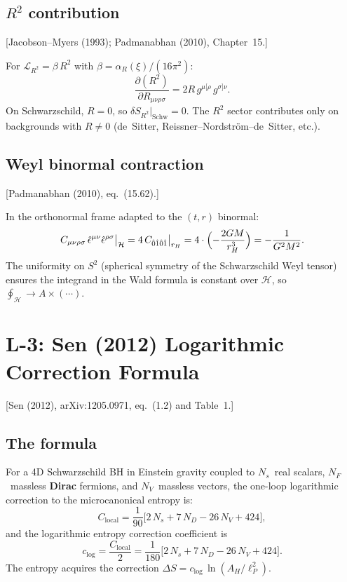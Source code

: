 \documentclass[12pt,a4paper]{article}
\theoremstyle{definition}
\theoremstyle{remark}
\newcommand{\fromlit}[1]{\textcolor{blue!70!black}{\textsf{[#1]}}}
\begin{document}
\subsection{$R^2$ contribution}
\fromlit{Jacobson--Myers (1993); Padmanabhan (2010), Chapter~15.}

For $\mathcal{L}_{R^2} = \beta\,R^2$ with
$\beta = \alpha_R(\xi)/(16\pi^2)$:
\begin{equation}
  \frac{\partial(R^2)}{\partial R_{\mu\nu\rho\sigma}}
  = 2R\,g^{\mu[\rho}\,g^{\sigma]\nu}.
\end{equation}
On Schwarzschild, $R = 0$, so $\delta S_{R^2}|_{\mathrm{Schw}} = 0$.
The $R^2$ sector contributes only on backgrounds with $R \neq 0$
(de~Sitter, Reissner--Nordstr\"om--de~Sitter, etc.).

\subsection{Weyl binormal contraction}
\fromlit{Padmanabhan (2010), eq.~(15.62).}

In the orthonormal frame adapted to the $(t,r)$ binormal:
\begin{equation}\label{eq:C-binormal}
  C_{\mu\nu\rho\sigma}\,\hat{\epsilon}^{\mu\nu}
  \hat{\epsilon}^{\rho\sigma}\big|_{\mathcal{H}}
  = 4\,C_{\hat{0}\hat{1}\hat{0}\hat{1}}\big|_{r_H}
  = 4 \cdot \Bigl(-\frac{2GM}{r_H^3}\Bigr)
  = -\frac{1}{G^2 M^2}.
\end{equation}
The uniformity on $S^2$ (spherical symmetry of the Schwarzschild
Weyl tensor) ensures the integrand in the Wald formula is constant
over $\mathcal{H}$, so $\oint_{\mathcal{H}} \to A \times (\cdots)$.


\section{L-3: Sen (2012) Logarithmic Correction Formula}
\label{sec:L3}

\fromlit{Sen (2012), arXiv:1205.0971, eq.~(1.2) and Table~1.}

\subsection{The formula}

For a 4D Schwarzschild BH in Einstein gravity coupled to $N_s$~real
scalars, $N_F$~massless \textbf{Dirac} fermions, and $N_V$~massless
vectors, the one-loop logarithmic correction to the microcanonical
entropy is:
\begin{equation}\label{eq:sen-formula}
  \boxed{
  C_{\mathrm{local}} = \frac{1}{90}\bigl[
    2\,N_s + 7\,N_D - 26\,N_V + 424
  \bigr],}
\end{equation}
and the logarithmic entropy correction coefficient is
\begin{equation}\label{eq:clog-def}
  \boxed{
  c_{\log} = \frac{C_{\mathrm{local}}}{2}
  = \frac{1}{180}\bigl[
    2\,N_s + 7\,N_D - 26\,N_V + 424
  \bigr].}
\end{equation}
The entropy acquires the correction
$\Delta S = c_{\log}\,\ln(A_H/\ell_P^2)$.
\end{document}
